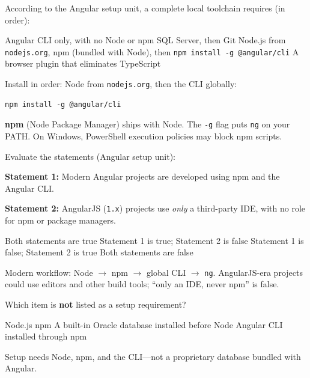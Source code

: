 \question[4]
According to the Angular setup unit, a complete local toolchain requires (in order):
\begin{choices}
  \choice Angular CLI only, with no Node or npm
  \choice SQL Server, then Git
  \CorrectChoice Node.js from \texttt{nodejs.org}, npm (bundled with Node), then \texttt{npm install -g @angular/cli}
  \choice A browser plugin that eliminates TypeScript
\end{choices}
\begin{solution}
  Install in order: Node from \texttt{nodejs.org}, then the CLI globally:
\begin{lstlisting}[style=bash]
npm install -g @angular/cli
\end{lstlisting}
  \textbf{npm} (Node Package Manager) ships with Node. The \lstinline[style=bashinline]{-g} flag puts \lstinline[style=bashinline]{ng} on your PATH. On Windows, PowerShell execution policies may block npm scripts.
\end{solution}

\question[4]
Evaluate the statements (Angular setup unit):

\textbf{Statement 1:} Modern Angular projects are developed using npm and the Angular CLI.

\textbf{Statement 2:} AngularJS (\texttt{1.x}) projects use \emph{only} a third-party IDE, with no role for npm or package managers.
\begin{choices}
  \choice Both statements are true
  \CorrectChoice Statement 1 is true; Statement 2 is false
  \choice Statement 1 is false; Statement 2 is true
  \choice Both statements are false
\end{choices}
\begin{solution}
  Modern workflow: Node $\rightarrow$ npm $\rightarrow$ global CLI $\rightarrow$ \lstinline[style=bashinline]{ng}. AngularJS-era projects could use editors and other build tools; ``only an IDE, never npm'' is false.
\end{solution}

\question[4]
Which item is \textbf{not} listed as a setup requirement?
\begin{choices}
  \choice Node.js
  \choice npm
  \CorrectChoice A built-in Oracle database installed before Node
  \choice Angular CLI installed through npm
\end{choices}
\begin{solution}
  Setup needs Node, npm, and the CLI---not a proprietary database bundled with Angular.
\end{solution}

